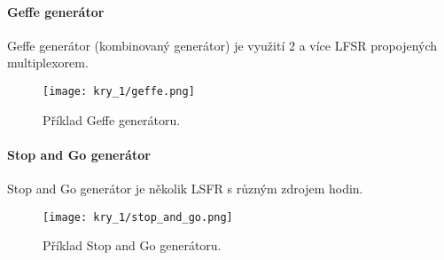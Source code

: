 \paragraph*{Geffe generátor} Geffe generátor (kombinovaný generátor) je využití 2 a více LFSR propojených multiplexorem.

\begin{figure}[H]
    \centering
    \texttt{[image: kry\_1/geffe.png]}
    \caption{Příklad Geffe generátoru.}
\end{figure}

\paragraph*{Stop and Go generátor} Stop and Go generátor je několik LSFR s různým zdrojem hodin.

\begin{figure}[H]
    \centering
    \texttt{[image: kry\_1/stop\_and\_go.png]}
    \caption{Příklad Stop and Go generátoru.}
\end{figure}
